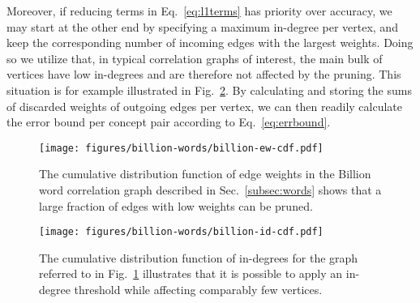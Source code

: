 \documentclass{sig-alternate}
\newcommand{\rn}[1]{\rho_{#1}}
\begin{document}
Moreover, if reducing terms in Eq.\ \ref{eq:l1terms} has priority over accuracy, we may start at the other end by specifying a maximum in-degree
per vertex, and keep the corresponding number of incoming edges with the largest weights. Doing so we utilize that, in
typical correlation graphs of interest, the main bulk of vertices have low in-degrees and are therefore not affected by the
pruning. This situation is for example illustrated in Fig.\ \ref{fig:billion-id-cdf}. By calculating and storing
the sums of discarded weights of outgoing edges per vertex, we can then readily calculate the error bound per concept
pair according to Eq.\ \ref{eq:errbound}.

\begin{figure}
\begin{centering}
\texttt{[image: figures/billion-words/billion-ew-cdf.pdf]}
\end{centering}
\caption{The cumulative distribution function of edge weights in the Billion word correlation graph described in Sec.\ \ref{subsec:words} shows that a large fraction of edges with low weights can be pruned.}
\label{fig:billion-ew-cdf}
\end{figure}

\begin{figure}
\begin{centering}
\texttt{[image: figures/billion-words/billion-id-cdf.pdf]}
\end{centering}
\caption{The cumulative distribution function of in-degrees for the graph referred to in Fig.\ \ref{fig:billion-ew-cdf} illustrates that it is possible to apply an in-degree threshold while affecting comparably few vertices.}
\label{fig:billion-id-cdf}
\end{figure}

\end{document}
